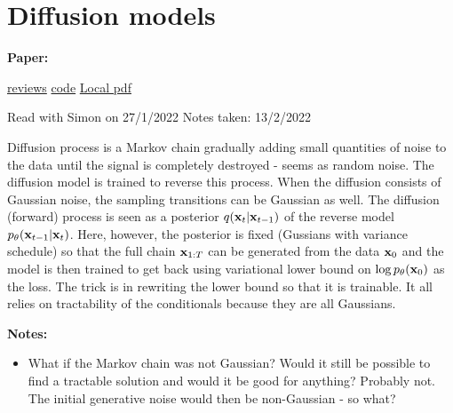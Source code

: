 \clearpage

\section{Diffusion models}\label{sec:Diffusion}

\begin{notebox}
\textbf{Paper: } 
\vspace{5pt}

\href{https://proceedings.neurips.cc/paper/2020/hash/4c5bcfec8584af0d967f1ab10179ca4b-Abstract.html}{reviews}
\hspace{1cm}
\href{https://github.com/hojonathanho/diffusion}{code}
\hspace{1cm}
\href{run:/home/magda/Dropbox/Zot/Ho et al_2020_Denoising Diffusion Probabilistic Models.pdf}{Local pdf}
\vspace{3pt}

Read with Simon on 27/1/2022
\hfill Notes taken: 13/2/2022 
\end{notebox}

\begin{notebox}[colback=red!5]
\tldr Diffusion process is a Markov chain gradually adding small quantities of noise to the data until the signal is completely destroyed - seems as random noise. 
The diffusion model is trained to reverse this process.
When the diffusion consists of Gaussian noise, the sampling transitions can be Gaussian as well.
The diffusion (forward) process is seen as a posterior $q({\mathbf{x}}_{t} \vert {\mathbf{x}}_{t-1})$ of the reverse model $p_{\theta}({\mathbf{x}}_{t-1} \vert {\mathbf{x}}_{t})$.
Here, however, the posterior is fixed (Gussians with variance schedule) so that the full chain ${\mathbf{x}}_{1:T}$ can be generated from the data ${\mathbf{x}}_0$ and the model is then trained to get back using variational lower bound on $\log p_{\theta}({\mathbf{x}}_0)$ as the loss. The trick is in rewriting the lower bound so that it is trainable. It all relies on tractability of the conditionals because they are all Gaussians.
\end{notebox}

\begin{notebox}[colback=yellow!5]
\textbf{Notes:} 
\begin{itemize}[nosep]
\item What if the Markov chain was not Gaussian? Would it still be possible to find a tractable solution and would it be good for anything? Probably not. The initial generative noise would then be non-Gaussian - so what?
\end{itemize}
\end{notebox}


